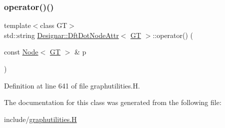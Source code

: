 \subsubsection{\texorpdfstring{operator()()}{operator()()}}
{\footnotesize\ttfamily template$<$class GT$>$ \\
std\+::string \hyperlink{class_designar_1_1_dft_dot_node_attr}{Designar\+::\+Dft\+Dot\+Node\+Attr}$<$ \hyperlink{demo-buildgraph_8_c_a3001c40d2c31ca87ed96cd7d1334a55e}{GT} $>$\+::operator() (\begin{DoxyParamCaption}\item[{const \hyperlink{namespace_designar_a5af326c65aa2bd26b26c410f2030d09e}{Node}$<$ \hyperlink{demo-buildgraph_8_c_a3001c40d2c31ca87ed96cd7d1334a55e}{GT} $>$ \&}]{p }\end{DoxyParamCaption})\hspace{0.3cm}{\ttfamily [inline]}}



Definition at line 641 of file graphutilities.\+H.



The documentation for this class was generated from the following file\+:\begin{DoxyCompactItemize}
\item 
include/\hyperlink{graphutilities_8_h}{graphutilities.\+H}\end{DoxyCompactItemize}
